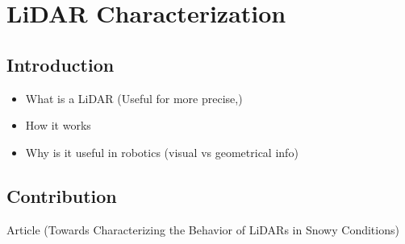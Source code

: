 \chapter{LiDAR Characterization}

\section{Introduction}
\label{sec:chap1_intro}
\begin{itemize}
    \item What is a LiDAR (Useful for more precise,)
    \item How it works
    \item Why is it useful in robotics (visual vs geometrical info)
\end{itemize}

\section{Contribution}
\label{sec:chap1_intro}
Article (Towards Characterizing the Behavior of LiDARs in Snowy Conditions)
